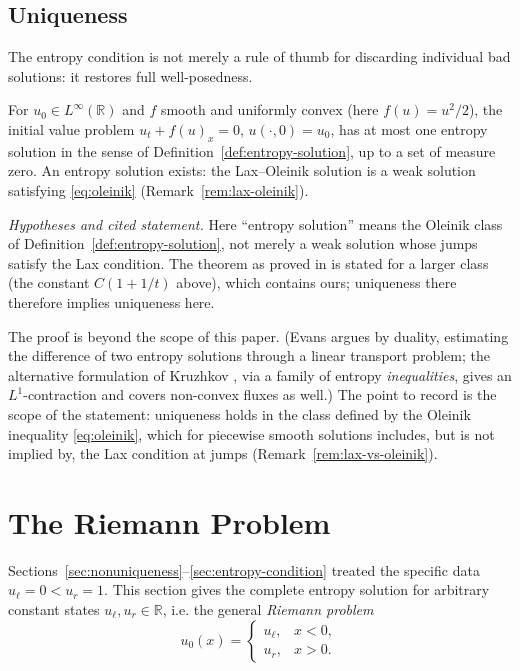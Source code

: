 \subsection{Uniqueness}
\label{subsec:entropy-uniqueness}

The entropy condition is not merely a rule of thumb for discarding
individual bad solutions: it restores full well-posedness.

\begin{theorem}
\label{thm:oleinik-uniqueness}
For $u_0 \in L^\infty(\mathbb{R})$ and $f$ smooth and uniformly convex
(here $f(u)=u^2/2$), the initial value problem
$u_t+f(u)_x=0$, $u(\cdot,0)=u_0$, has at most one entropy solution in
the sense of Definition~\ref{def:entropy-solution}, up to a set of measure
zero. An entropy solution exists: the Lax--Oleinik solution
\cite[\S3.4.2]{evans2010} is a weak solution satisfying
\eqref{eq:oleinik} (Remark~\ref{rem:lax-oleinik}).
\end{theorem}

\noindent \emph{Hypotheses and cited statement.} Here ``entropy solution''
means the Oleinik class of Definition~\ref{def:entropy-solution}, not merely
a weak solution whose jumps satisfy the Lax condition. The theorem as
proved in \cite[\S3.4.3]{evans2010} is stated for a larger class (the
constant $C(1+1/t)$ above), which contains ours; uniqueness there therefore
implies uniqueness here.

\noindent The proof is beyond the scope of this paper. (Evans argues by
duality, estimating the difference of two entropy solutions through a
linear transport problem; the alternative formulation of Kruzhkov \cite{kruzhkov1970}, via a
family of entropy \emph{inequalities}, gives an $L^1$-contraction and
covers non-convex fluxes as well.) The point to record is the scope of the
statement: uniqueness holds in the class defined by the Oleinik
inequality \eqref{eq:oleinik}, which for piecewise smooth solutions
includes, but is not implied by, the Lax condition at jumps
(Remark~\ref{rem:lax-vs-oleinik}).


\section{The Riemann Problem}
\label{sec:riemann-problem}

Sections~\ref{sec:nonuniqueness}--\ref{sec:entropy-condition} treated the
specific data $u_\ell=0<u_r=1$. This section gives the complete entropy
solution for arbitrary constant states $u_\ell, u_r \in \mathbb{R}$, i.e.
the general \emph{Riemann problem}
\begin{equation}
  \label{eq:general-riemann-data}
  u_0(x) = \begin{cases} u_\ell, & x<0, \\ u_r, & x>0. \end{cases}
\end{equation}

